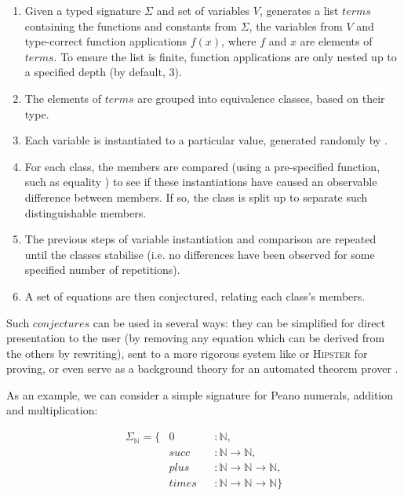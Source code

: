 \begin{enumerate}
  \item Given a typed signature $\Sigma$ and set of variables $V$, \qspec{} generates a list $terms$ containing the functions and constants from $\Sigma$, the variables from $V$ and type-correct function applications $f(x)$, where $f$ and $x$ are elements of $terms$. To ensure the list is finite, function applications are only nested up to a specified depth (by default, 3).
  \item The elements of $terms$ are grouped into equivalence classes, based on their type.
  \item Each variable is instantiated to a particular value, generated randomly by \qcheck{}.
  \item For each class, the members are compared (using a pre-specified function, such as equality \hs{==}) to see if these instantiations have caused an observable difference between members. If so, the class is split up to separate such distinguishable members.
  \item The previous steps of variable instantiation and comparison are repeated until the classes stabilise (i.e. no differences have been observed for some specified number of repetitions).
  \item A set of equations are then conjectured, relating each class's members.
\end{enumerate}

Such $conjectures$ can be used in several ways: they can be simplified for direct presentation to the user (by removing any equation which can be derived from the others by rewriting), sent to a more rigorous system like \hspec{} or \textsc{Hipster} for proving, or even serve as a background theory for an automated theorem prover \citep{claessen2013automating}.

As an example, we can consider a simple signature for Peano numerals, addition and multiplication:

\begin{align*}
  \Sigma_{\mathbb{N}} = \{ & 0     && : \mathbb{N}, \\
                        & succ  && : \mathbb{N} \rightarrow \mathbb{N}, \\
                        & plus  && : \mathbb{N} \rightarrow \mathbb{N} \rightarrow \mathbb{N}, \\
                        & times && : \mathbb{N} \rightarrow \mathbb{N} \rightarrow \mathbb{N}\}
\end{align*}

